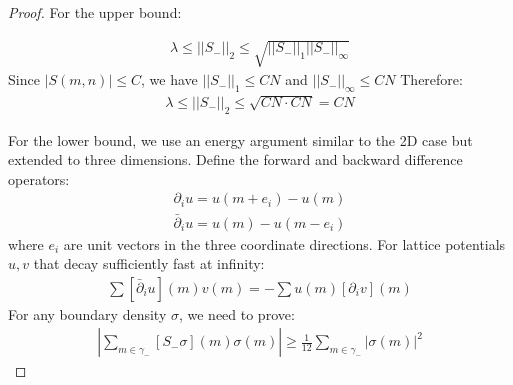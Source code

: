 \begin{proof}
For the upper bound:

\begin{align}
\lambda  \leq ||S_-||_2 \leq \sqrt{||S_-||_1||S_-||_{\infty}}
\end{align}
Since $|S(m,n)| \leq C$, we have $||S_-||_1 \leq CN$ and $||S_-||_\infty \leq CN$
Therefore:
\begin{align}
\lambda\leq ||S_-||_2 \leq \sqrt{CN\cdot CN} = CN
\end{align}

For the lower bound, we use an energy argument similar to the 2D case \cite{martinsson2009boundary} but extended to three dimensions.
Define the forward and backward difference operators:
\begin{subequations}
\begin{align}
\partial_i u = u(m + e_i) - u(m)\\
\bar{\partial}_i u = u(m) - u(m - e_i)
\end{align}
\end{subequations}
where $e_i$ are unit vectors in the three coordinate directions.
For lattice potentials $u, v$ that decay sufficiently fast at infinity:
\begin{align}
\sum [\bar{\partial}_iu](m)v(m) = -\sum u(m)[\partial_iv](m)
\end{align}
For any boundary density $\sigma$, we need to prove:
\begin{align}
\left|\sum_{m\in\gamma_-} [S_-\sigma](m) \sigma(m)\right|\geq \frac{1}{12}\sum_{m\in\gamma_-} |\sigma(m)|^2
\end{align}


\end{proof}
